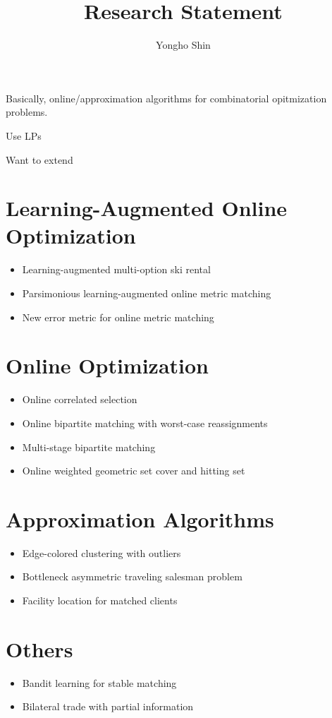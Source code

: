 \documentclass{article}
\title{Research Statement}
\author{Yongho Shin}
\date{}
\begin{document}
\maketitle

Basically, online/approximation algorithms for combinatorial opitmization problems.

Use LPs

Want to extend

\section{Learning-Augmented Online Optimization}
\begin{itemize}
\item Learning-augmented multi-option ski rental
\item Parsimonious learning-augmented online metric matching
\item New error metric for online metric matching
\end{itemize}

\section{Online Optimization}
\begin{itemize}
\item Online correlated selection
\item Online bipartite matching with worst-case reassignments
\item Multi-stage bipartite matching
\item Online weighted geometric set cover and hitting set
\end{itemize}

\section{Approximation Algorithms}
\begin{itemize}
\item Edge-colored clustering with outliers
\item Bottleneck asymmetric traveling salesman problem
\item Facility location for matched clients
\end{itemize}

\section{Others}
\begin{itemize}
\item Bandit learning for stable matching
\item Bilateral trade with partial information
\end{itemize}
\end{document}
